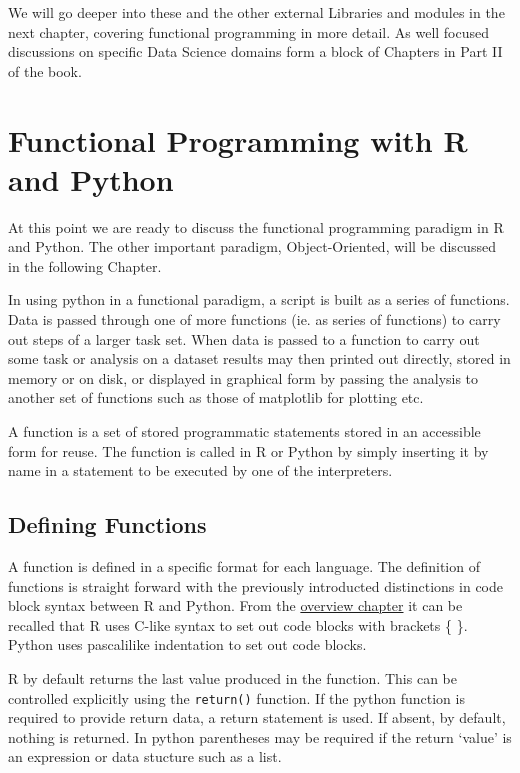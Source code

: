 \documentclass[]{book}
\theoremstyle{definition}
\theoremstyle{definition}
\theoremstyle{definition}
\theoremstyle{remark}
\begin{document}
We will go deeper into these and the other external Libraries and
modules in the next chapter, covering functional programming in more
detail. As well focused discussions on specific Data Science domains
form a block of Chapters in Part II of the book.

\chapter{Functional Programming with R and
Python}\label{functional-programming-with-r-and-python}

At this point we are ready to discuss the functional programming
paradigm in R and Python. The other important paradigm, Object-Oriented,
will be discussed in the following Chapter.

In using python in a functional paradigm, a script is built as a series
of functions. Data is passed through one of more functions (ie. as
series of functions) to carry out steps of a larger task set. When data
is passed to a function to carry out some task or analysis on a dataset
results may then printed out directly, stored in memory or on disk, or
displayed in graphical form by passing the analysis to another set of
functions such as those of matplotlib  for plotting
etc.

A function is a set of stored programmatic statements stored in an
accessible form for reuse. The function is called in R or Python by
simply inserting it by name in a statement to be executed by one of the
interpreters.

\section{Defining Functions}\label{defining-functions}

A function is defined in a specific format for each language. The
definition of functions is straight forward with the previously
introducted distinctions in code block syntax between R and Python. From
the \href{Comparative_Overview.Rmd}{overview chapter} it can be recalled
that R uses C-like syntax to set out code blocks with brackets \{ \}.
Python uses pascalilike indentation to set out code blocks.

R by default returns the last value produced in the function. This can
be controlled explicitly using the \texttt{return()} function. If the
python function is required to provide return data, a return statement
is used. If absent, by default, nothing is returned. In python
parentheses may be required if the return `value' is an expression or
data stucture such as a list.
\end{document}
